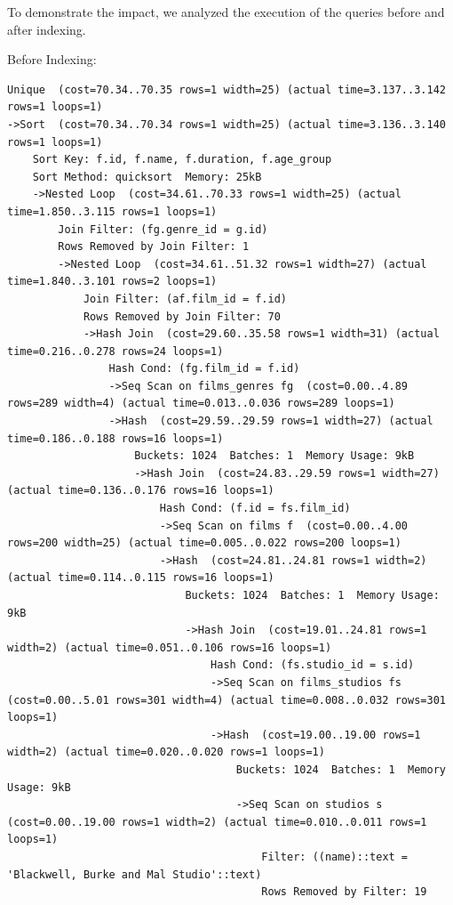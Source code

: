 \documentclass[11pt, a4paper]{article}
\begin{document}
To demonstrate the impact, we analyzed the execution of the queries before and after indexing.

Before Indexing:
\begin{lstlisting}
Unique  (cost=70.34..70.35 rows=1 width=25) (actual time=3.137..3.142 rows=1 loops=1)
->Sort  (cost=70.34..70.34 rows=1 width=25) (actual time=3.136..3.140 rows=1 loops=1)
    Sort Key: f.id, f.name, f.duration, f.age_group
    Sort Method: quicksort  Memory: 25kB
    ->Nested Loop  (cost=34.61..70.33 rows=1 width=25) (actual time=1.850..3.115 rows=1 loops=1)
        Join Filter: (fg.genre_id = g.id)
        Rows Removed by Join Filter: 1
        ->Nested Loop  (cost=34.61..51.32 rows=1 width=27) (actual time=1.840..3.101 rows=2 loops=1)
            Join Filter: (af.film_id = f.id)
            Rows Removed by Join Filter: 70
            ->Hash Join  (cost=29.60..35.58 rows=1 width=31) (actual time=0.216..0.278 rows=24 loops=1)
                Hash Cond: (fg.film_id = f.id)
                ->Seq Scan on films_genres fg  (cost=0.00..4.89 rows=289 width=4) (actual time=0.013..0.036 rows=289 loops=1)
                ->Hash  (cost=29.59..29.59 rows=1 width=27) (actual time=0.186..0.188 rows=16 loops=1)
                    Buckets: 1024  Batches: 1  Memory Usage: 9kB
                    ->Hash Join  (cost=24.83..29.59 rows=1 width=27) (actual time=0.136..0.176 rows=16 loops=1)
                        Hash Cond: (f.id = fs.film_id)
                        ->Seq Scan on films f  (cost=0.00..4.00 rows=200 width=25) (actual time=0.005..0.022 rows=200 loops=1)
                        ->Hash  (cost=24.81..24.81 rows=1 width=2) (actual time=0.114..0.115 rows=16 loops=1)
                            Buckets: 1024  Batches: 1  Memory Usage: 9kB
                            ->Hash Join  (cost=19.01..24.81 rows=1 width=2) (actual time=0.051..0.106 rows=16 loops=1)
                                Hash Cond: (fs.studio_id = s.id)
                                ->Seq Scan on films_studios fs  (cost=0.00..5.01 rows=301 width=4) (actual time=0.008..0.032 rows=301 loops=1)
                                ->Hash  (cost=19.00..19.00 rows=1 width=2) (actual time=0.020..0.020 rows=1 loops=1)
                                    Buckets: 1024  Batches: 1  Memory Usage: 9kB
                                    ->Seq Scan on studios s  (cost=0.00..19.00 rows=1 width=2) (actual time=0.010..0.011 rows=1 loops=1)
                                        Filter: ((name)::text = 'Blackwell, Burke and Mal Studio'::text)
                                        Rows Removed by Filter: 19

\end{lstlisting}
\end{document}
